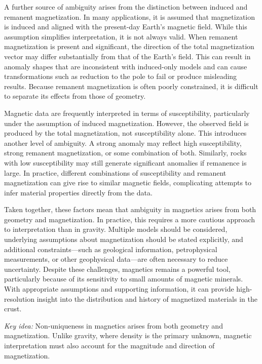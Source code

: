 A further source of ambiguity arises from the distinction between induced and remanent magnetization. In many applications, it is assumed that magnetization is induced and aligned with the present-day Earth's magnetic field. While this assumption simplifies interpretation, it is not always valid. When remanent magnetization is present and significant, the direction of the total magnetization vector may differ substantially from that of the Earth's field. This can result in anomaly shapes that are inconsistent with induced-only models and can cause transformations such as reduction to the pole to fail or produce misleading results. Because remanent magnetization is often poorly constrained, it is difficult to separate its effects from those of geometry.

Magnetic data are frequently interpreted in terms of susceptibility, particularly under the assumption of induced magnetization. However, the observed field is produced by the total magnetization, not susceptibility alone. This introduces another level of ambiguity. A strong anomaly may reflect high susceptibility, strong remanent magnetization, or some combination of both. Similarly, rocks with low susceptibility may still generate significant anomalies if remanence is large. In practice, different combinations of susceptibility and remanent magnetization can give rise to similar magnetic fields, complicating attempts to infer material properties directly from the data.

Taken together, these factors mean that ambiguity in magnetics arises from both geometry and magnetization. In practice, this requires a more cautious approach to interpretation than in gravity. Multiple models should be considered, underlying assumptions about magnetization should be stated explicitly, and additional constraints—such as geological information, petrophysical measurements, or other geophysical data—are often necessary to reduce uncertainty. Despite these challenges, magnetics remains a powerful tool, particularly because of its sensitivity to small amounts of magnetic minerals. With appropriate assumptions and supporting information, it can provide high-resolution insight into the distribution and history of magnetized materials in the crust.

\emph{Key idea:} Non-uniqueness in magnetics arises from both geometry and magnetization. Unlike gravity, where density is the primary unknown, magnetic interpretation must also account for the magnitude and direction of magnetization.

